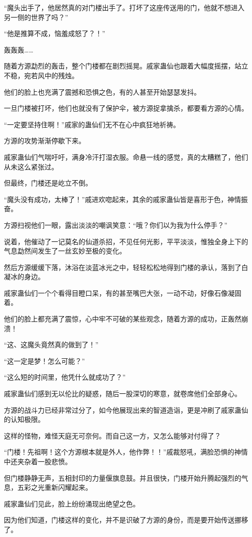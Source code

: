 \begin{this_body}
“魔头出手了，他居然真的对门楼出手了。打坏了这座传送用的门，他就不想进入另一侧的世界了吗？”

“他是推算不成，恼羞成怒了？！”

轰轰轰……

随着方源勐烈的轰击，整个门楼都在剧烈摇晃。戚家蛊仙也跟着大幅度摇摆，站立不稳，宛若风中的残烛。

他们的脸上也充满了震撼和恐惧之色，有的人甚至开始瑟瑟发抖。

一旦门楼被打坏，他们也就没有了保护伞，被方源捉拿擒杀，都要看方源的心情。

“一定要坚持住啊！”戚家的蛊仙们无不在心中疯狂地祈祷。

方源的攻势渐渐停歇下来。

戚家蛊仙们气喘吁吁，满身冷汗打湿衣服。命悬一线的感觉，真的太糟糕了，他们从未这么紧张过。

但最终，门楼还是屹立不倒。

“魔头没有成功，太棒了！”戚进欢唿起来，其余的戚家蛊仙皆是喜形于色，神情振奋。

方源扫视他们一眼，露出淡淡的嘲讽笑意：“哦？你们以为我为什么停手？”

说着，他催动了一记莫名的仙道杀招，不见任何光影，平平淡淡，惟独全身上下的气息勐然间发生了一丝玄妙至极的变化。

然后方源缓缓下落，沐浴在淡蓝冰光之中，轻轻松松地得到门楼的承认，落到了白凝冰的身边。

戚家蛊仙们一个个看得目瞪口呆，有的甚至嘴巴大张，一动不动，好像石像凝固着。

他们的脸上都充满了震惊，心中牢不可破的某些观念，随着方源的成功，正轰然崩溃！

“这、这魔头竟然真的做到了！”

“这一定是梦！怎么可能？”

“这么短的时间里，他凭什么就成功了？”

戚家蛊仙们感到无以伦比的疑惑，随后一股深切的寒意，就卷席他们全部身心。

方源的战斗力已经非常过分了，如今他展现出来的智道造诣，更是冲刷了戚家蛊仙的认知极限。

这样的怪物，难怪天庭无可奈何。而自己这一方，又怎么能够对付得了？

“门楼！先祖啊！这个方源根本就是外人，他作弊！！”戚裁怒吼，满脸恐惧的神情中还夹杂着一股悲愤。

但门楼静静无声，五相封印的力量偃旗息鼓。并且很快，门楼开始升腾起强烈的气息，五彩之光重新闪耀起来。

戚家蛊仙们见此，脸上纷纷涌现出绝望之色。

因为他们知道，门楼这样的变化，并不是识破了方源的身份，而是要开始传送挪移了。

\end{this_body}

